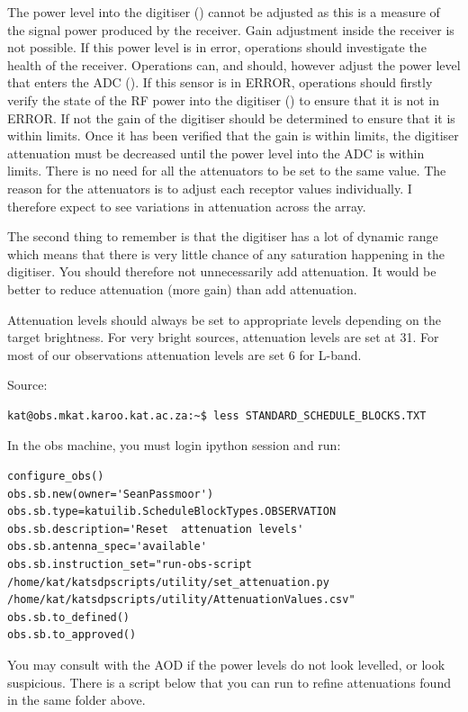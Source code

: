The power level into the digitiser () cannot be adjusted as this is a measure of the signal power produced by the receiver. Gain adjustment inside the receiver is not possible. If this power level is in error, operations should investigate the health of the receiver.
Operations can, and should, however adjust the power level that enters the ADC (). If this sensor is in ERROR, operations should firstly verify the state of the RF power into the digitiser () to ensure that it is not in ERROR. If not the gain of the digitiser should be determined to ensure that it is within limits. Once it has been verified that the gain is within limits, the digitiser attenuation must be decreased until the power level into the ADC is within limits. There is no need for all the attenuators to be set to the same value. The reason for the attenuators is to adjust each receptor values individually. I therefore expect to see variations in attenuation across the array.

The second thing to remember is that the digitiser has a lot of dynamic range which means that there is very little chance of any saturation happening in the digitiser. You should therefore not unnecessarily add attenuation. It would be better to reduce attenuation (more gain) than add attenuation.

Attenuation levels should always be set to appropriate levels depending on the target brightness.  For very bright sources, attenuation levels are set at 31.  For most of our observations attenuation levels are set 6 for L-band.

Source:
\begin{lstlisting}[style=DOS]
kat@obs.mkat.karoo.kat.ac.za:~$ less STANDARD_SCHEDULE_BLOCKS.TXT 
\end{lstlisting}


In the obs machine, you must login ipython session and run: 
\begin{lstlisting}[style=DOS]
configure_obs()
obs.sb.new(owner='SeanPassmoor')
obs.sb.type=katuilib.ScheduleBlockTypes.OBSERVATION
obs.sb.description='Reset  attenuation levels'
obs.sb.antenna_spec='available'
obs.sb.instruction_set="run-obs-script /home/kat/katsdpscripts/utility/set_attenuation.py /home/kat/katsdpscripts/utility/AttenuationValues.csv"
obs.sb.to_defined()
obs.sb.to_approved()
\end{lstlisting}



You may consult with the AOD if the power levels do not look levelled, or look suspicious. There is a script below that you can run to refine attenuations found in the same folder above.

